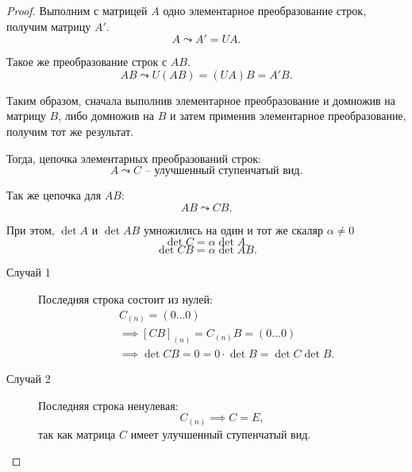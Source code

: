 \begin{proof}

    Выполним с матрицей $A$ одно элементарное преобразование строк, получим матрицу $A'$.
    \begin{equation*}
        A \leadsto A' = U A
    .\end{equation*}

    Такое же преобразование строк с $AB$.
    \begin{equation*}
        AB \leadsto U(AB) = (UA)B = A'B
    .\end{equation*}

    Таким образом, сначала выполнив элементарное преобразование и домножив на матрицу $B$, либо домножив на $B$ и затем применив элементарное преобразование, получим тот же результат.

    Тогда, цепочка элементарных преобразований строк:
    \begin{equation*}
        A \leadsto C \text{ -- улучшенный ступенчатый вид}
    .\end{equation*}

    Так же цепочка для $AB$:
    \begin{equation*}
        AB \leadsto CB
    .\end{equation*}

    При этом, $\det A$ и $\det AB$ умножились на один и тот же скаляр $\alpha \neq 0$
    \begin{equation*}
        \det C = \alpha \det A
    .\end{equation*}
    \begin{equation*}
        \det CB = \alpha \det AB
    .\end{equation*}

    \begin{description}
    \item[Случай 1]
        Последняя строка состоит из нулей:
        \begin{align*}
            &C_{(n)} = (0 \dots 0) \\
            &\implies [CB]_{(n)} = C_{(n)} B = (0 \dots 0) \\
            &\implies \det CB = 0 = 0 \cdot \det B = \det C \det B
        .\end{align*}

    \item[Случай 2]
        Последняя строка ненулевая:
        \begin{equation*}
            \tag{$star$}
            C_{(n)} \implies C = E
        ,\end{equation*}
        так как матрица $C$ имеет улучшенный ступенчатый вид.


\end{description}
\end{proof}
